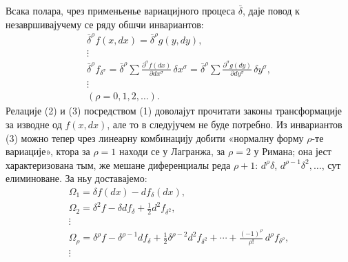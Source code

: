 ﻿\documentclass[11pt]{article}
\providecommand{\bdelta}{\bar{\delta}}
\begin{document}
Всака полара, чрез применьенье вариацијного процеса \(\bdelta\), даје повод к незавршивајучему се ряду обшчи инвариантов:
\begin{equation}
\begin{gathered}
\bdelta^\rho f(x,dx)=\bdelta^\rho g(y,dy),\\
\vdots\\
\bdelta^\rho f_{\delta^\sigma}
=\bdelta^\rho\sum\frac{\partial^\sigma f(dx)}{\partial dx^\sigma}\,
\delta x^\sigma
=\bdelta^\rho\sum\frac{\partial^\sigma g(dy)}{\partial dy^\sigma}\,
\delta y^\sigma,\\
\vdots\\[0.2em]
(\rho=0,1,2,\ldots).
\end{gathered}
\tag{3}
\end{equation}
Релације (2) и (3) посредством (1) доволајут прочитати законы трансформације за изводне од \(f(x,dx)\), але то в следујучем не буде потребно. Из инвариантов (3) можно тепер чрез линеарну комбинацију добити «нормалну форму \(\rho\)-те вариације», ктора за \(\rho=1\) находи се у Лагранжа, за \(\rho=2\) у Римана; она јест характеризована тым, же мешане диференциалы реда \(\rho+1\): \(d^\rho\delta\), \(d^{\rho-1}\delta^2,\ldots\), сут елиминоване. За ньу доставајемо:
\begin{equation}
\begin{gathered}
\Omega_1=\delta f(dx)-d f_\delta(dx),\\
\Omega_2=\delta^2 f-\delta d f_\delta+\frac12 d^2 f_{\delta^2},\\
\vdots\\
\Omega_\rho=\delta^\rho f-\delta^{\rho-1}d f_\delta
+\frac12\delta^{\rho-2}d^2 f_{\delta^2}
+\cdots+\frac{(-1)^\rho}{\rho!}\,d^\rho f_{\delta^\rho},\\
\vdots
\end{gathered}
\tag{4}
\end{equation}
\end{document}
